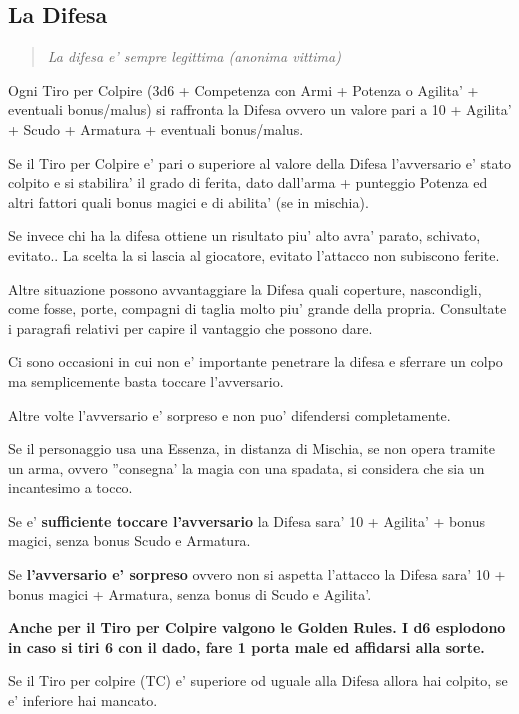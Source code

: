 \documentclass[a4paper,11pt,twoside,openany]{book}
\begin{document}
\subsection{La Difesa}

\label{la-difesa}
\begin{quote}\textit{
		La difesa e' sempre legittima (anonima vittima)
}\end{quote}
Ogni Tiro per Colpire (3d6 + Competenza con Armi + Potenza o Agilita' + eventuali bonus/malus) si raffronta la Difesa ovvero un valore pari a 10 + Agilita' + Scudo + Armatura + eventuali bonus/malus.

Se il Tiro per Colpire e' pari o superiore al valore della Difesa l'avversario e' stato colpito e si stabilira' il grado di ferita, dato dall'arma + punteggio Potenza ed altri fattori quali bonus magici e di abilita' (se in mischia).

Se invece chi ha la difesa ottiene un risultato piu' alto avra' parato, schivato, evitato.. La scelta la si lascia al giocatore, evitato l'attacco non subiscono ferite.

Altre situazione possono avvantaggiare la Difesa quali coperture, nascondigli, come fosse, porte, compagni di taglia molto piu' grande della propria. Consultate i paragrafi relativi per capire il vantaggio che possono dare.

Ci sono occasioni in cui non e' importante penetrare la difesa e sferrare un colpo ma semplicemente basta toccare l'avversario.

Altre volte l'avversario e' sorpreso e non puo' difendersi completamente.

Se il personaggio usa una Essenza, in distanza di Mischia, se non opera tramite un arma, ovvero ''consegna' la magia con una spadata, si considera che sia un incantesimo a tocco.

Se e' \textbf{sufficiente toccare l'avversario} la Difesa sara' 10 + Agilita' + bonus magici, senza bonus Scudo e Armatura.

Se \textbf{l'avversario e' sorpreso} ovvero non si aspetta l'attacco la Difesa sara' 10 + bonus magici + Armatura, senza bonus di Scudo e Agilita'.

\textbf{Anche per il Tiro per Colpire valgono le Golden Rules. I d6 esplodono in caso si tiri 6 con il dado, fare 1 porta male ed affidarsi alla sorte.}

Se il Tiro per colpire (TC) e' superiore od uguale alla Difesa allora hai colpito, se e' inferiore hai mancato.
\end{document}
